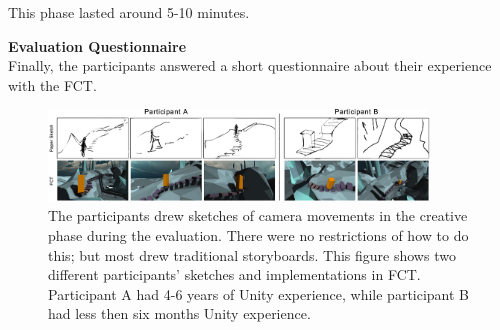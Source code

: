 This phase lasted around 5-10 minutes.

\textbf{Evaluation Questionnaire}\\
Finally, the participants answered a short questionnaire about their experience with the FCT.

\begin{figure}[htbp]
\centering
\includegraphics[width=0.9\textwidth]{Pics/Sketching_FramingsNew}
\caption{The participants drew sketches of camera movements in the creative phase during the evaluation. There were no restrictions of how to do this; but most drew traditional storyboards. This figure shows two different participants' sketches and implementations in FCT. Participant A had 4-6 years of Unity experience, while participant B had less then six months Unity experience.}
\label{fig:Sketching_Framings}
\end{figure}